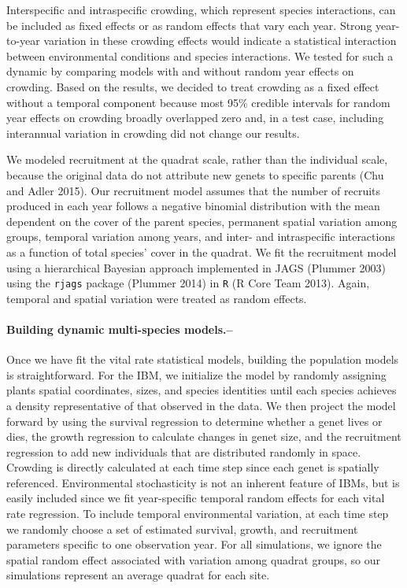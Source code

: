 \documentclass[12pt,]{article}
\begin{document}
Interspecific and intraspecific crowding, which represent species interactions, can be included as fixed effects or as random effects that vary each year.
Strong year-to-year variation in these crowding effects would indicate a statistical interaction between environmental conditions and species interactions.
We tested for such a dynamic by comparing models with and without random year effects on crowding.
Based on the results, we decided to treat crowding as a fixed effect without a temporal component because most 95\% credible intervals for random year effects on crowding broadly overlapped zero and, in a test case, including interannual variation in crowding did not change our results.

We modeled recruitment at the quadrat scale, rather than the individual
scale, because the original data do not attribute new genets to specific
parents (Chu and Adler 2015). Our recruitment model assumes that the
number of recruits produced in each year follows a negative binomial
distribution with the mean dependent on the cover of the parent species,
permanent spatial variation among groups, temporal variation among
years, and inter- and intraspecific interactions as a function of total
species' cover in the quadrat. We fit the recruitment model using a
hierarchical Bayesian approach implemented in JAGS (Plummer 2003) using
the \texttt{rjags} package (Plummer 2014) in \texttt{R} (R Core Team 2013). Again,
temporal and spatial variation were treated as random effects.

\paragraph{Building dynamic multi-species
models.--}\label{building-dynamic-multi-species-models.}

Once we have fit the vital rate statistical models, building the
population models is straightforward. For the IBM, we initialize the
model by randomly assigning plants spatial coordinates, sizes, and
species identities until each species achieves a density representative
of that observed in the data. We then project the model forward by using
the survival regression to determine whether a genet lives or dies, the
growth regression to calculate changes in genet size, and the
recruitment regression to add new individuals that are distributed
randomly in space. Crowding is directly calculated at each time step
since each genet is spatially referenced. Environmental stochasticity is
not an inherent feature of IBMs, but is easily included since we fit
year-specific temporal random effects for each vital rate regression. To
include temporal environmental variation, at each time step we randomly
choose a set of estimated survival, growth, and recruitment parameters
specific to one observation year. For all simulations, we ignore the
spatial random effect associated with variation among quadrat groups, so
our simulations represent an average quadrat for each site.
\end{document}
